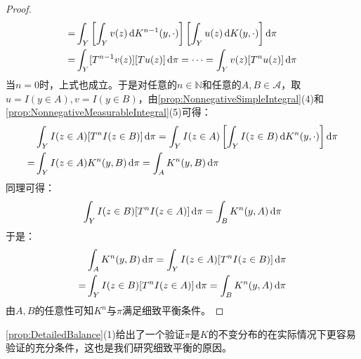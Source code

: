 \begin{proof}
\begin{align*}
		=&\int_{Y}\left[\int_{Y}v(z)\mathop{}\!\mathrm{d} K^{n-1}(y,\cdot)\right]\left[\int_{Y}u(z)\mathop{}\!\mathrm{d} K(y,\cdot)\right]\mathop{}\!\mathrm{d}\pi \\
		=&\int_{Y}[T^{n-1}v(z)][Tu(z)]\mathop{}\!\mathrm{d}\pi=\cdots=\int_{Y}v(z)[T^nu(z)]\mathop{}\!\mathrm{d}\pi
	\end{align*}
	当$n=0$时，上式也成立。于是对任意的$n\in\mathbb{N}$和任意的$A,B\in\mathscr{A}$，取$u=I(y\in A),v=I(y\in B)$，由\cref{prop:NonnegativeSimpleIntegral}(4)和\cref{prop:NonnegativeMeasurableIntegral}(5)可得：
	\begin{align*}
		&\int_{Y}I(z\in A)[T^nI(z\in B)]\mathop{}\!\mathrm{d}\pi=\int_{Y}I(z\in A)\left[\int_{Y}I(z\in B)\mathop{}\!\mathrm{d} K^n(y,\cdot)\right]\mathop{}\!\mathrm{d}\pi \\
		=&\int_{Y}I(z\in A)K^n(y,B)\mathop{}\!\mathrm{d}\pi=\int_{A}K^n(y,B)\mathop{}\!\mathrm{d}\pi
	\end{align*}
	同理可得：
	\begin{equation*}
		\int_{Y}I(z\in B)[T^nI(z\in A)]\mathop{}\!\mathrm{d}\pi=\int_{B}K^n(y,A)\mathop{}\!\mathrm{d}\pi
	\end{equation*}
	于是：
	\begin{align*}
		&\int_{A}K^n(y,B)\mathop{}\!\mathrm{d}\pi=\int_{Y}I(z\in A)[T^nI(z\in B)]\mathop{}\!\mathrm{d}\pi \\
		=&\int_{Y}I(z\in B)[T^nI(z\in A)]\mathop{}\!\mathrm{d}\pi=\int_{B}K^n(y,A)\mathop{}\!\mathrm{d}\pi
	\end{align*}
	由$A,B$的任意性可知$K^n$与$\pi$满足细致平衡条件。
\end{proof}
\begin{note}
	\cref{prop:DetailedBalance}(1)给出了一个验证$\pi$是$K$的不变分布的在实际情况下更容易验证的充分条件，这也是我们研究细致平衡的原因。
\end{note}
